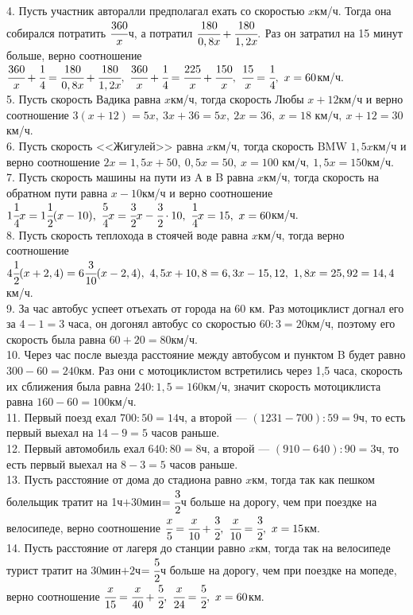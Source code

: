 4. Пусть участник авторалли предполагал ехать со скоростью $x$км/ч. Тогда она собирался потратить $\cfrac{360}{x}$ч, а потратил $\cfrac{180}{0,8x}+\cfrac{180}{1,2x}.$ Раз он затратил на 15 минут больше, верно соотношение $\cfrac{360}{x}+\cfrac{1}{4}=\cfrac{180}{0,8x}+\cfrac{180}{1,2x},\ \cfrac{360}{x}+\cfrac{1}{4}=\cfrac{225}{x}+\cfrac{150}{x},\ \cfrac{15}{x}=\cfrac{1}{4},\ x=60$км/ч.\\
5. Пусть скорость Вадика равна $x$км/ч, тогда скорость Любы $x+12$км/ч и верно соотношение $3(x+12)=5x,\ 3x+36=5x,\ 2x=36,\ x=18\text{ км/ч},\ x+12=30$км/ч.\\
6. Пусть скорость <<Жигулей>> равна $x$км/ч, тогда скорость BMW $1,5x$км/ч и верно соотношение $2x=1,5x+50,\ 0,5x=50,\ x=100\text{ км/ч},\ 1,5x=150$км/ч.\\
7. Пусть скорость машины на пути из A в B равна $x$км/ч, тогда скорость на обратном пути равна $x-10$км/ч и верно соотношение $1\cfrac{1}{4}x=1\cfrac{1}{2}(x-10),\
\cfrac{5}{4}x=\cfrac{3}{2}x-\cfrac{3}{2}\cdot10,\ \cfrac{1}{4}x=15,\ x=60$км/ч.\\
8. Пусть скорость теплохода в стоячей воде равна $x$км/ч, тогда верно соотношение $4\cfrac{1}{2}(x+2,4)=6\cfrac{3}{10}(x-2,4),\ 4,5x+10,8=6,3x-15,12,\
1,8x=25,92=14,4$км/ч.\\
9. За час автобус успеет отъехать от города на 60 км. Раз мотоциклист догнал его за $4-1=3$ часа, он догонял автобус со скоростью $60:3=20$км/ч, поэтому его скорость была равна $60+20=80$км/ч.\\
10. Через час после выезда расстояние между автобусом и пунктом B будет равно $300-60=240$км. Раз они с мотоциклистом встретились через 1,5 часа, скорость их сближения была равна $240:1,5=160$км/ч, значит скорость мотоциклиста равна $160-60=100$км/ч.\\
11. Первый поезд ехал $700:50=14$ч, а второй --- $(1231-700):59=9$ч, то есть первый выехал на $14-9=5$ часов раньше.\\
12. Первый автомобиль ехал $640:80=8$ч, а второй --- $(910-640):90=3$ч, то есть первый выехал на $8-3=5$ часов раньше.\\
13. Пусть расстояние от дома до стадиона равно $x$км, тогда так как пешком болельщик тратит на 1ч$+$30мин$=\cfrac{3}{2}$ч больше на дорогу, чем при поездке на велосипеде, верно соотношение $\cfrac{x}{5}=\cfrac{x}{10}+\cfrac{3}{2},\ \cfrac{x}{10}=\cfrac{3}{2},\ x=15$км.\\
14. Пусть расстояние от лагеря до станции равно $x$км, тогда так на велосипеде турист тратит на 30мин$+2$ч$=\cfrac{5}{2}$ч больше на дорогу, чем при поездке на мопеде, верно соотношение $\cfrac{x}{15}=\cfrac{x}{40}+\cfrac{5}{2},\ \cfrac{x}{24}=\cfrac{5}{2},\ x=60$км.\\
